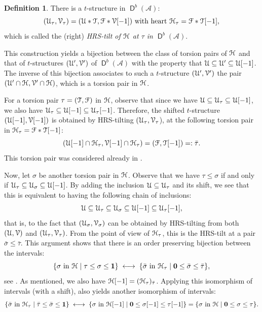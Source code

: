 \documentclass[a4paper,11pt]{amsart}
\theoremstyle{plain}
\theoremstyle{definition}
\newtheorem{dfn}[thm]{Definition}
\newcommand{\Acal}{\mathcal{A}} \newcommand{\Bcal}{\mathcal{B}} \newcommand{\Ccal}{\mathcal{C}}
\newcommand{\Vcal}{\mathcal{V}} \newcommand{\Wcal}{\mathcal{W}} \newcommand{\Xcal}{\mathcal{X}}
\DeclareMathOperator{\D}{\mathsf{D}}
\begin{document}
\begin{dfn}
	There is a $t$-structure in $\D^b(\Acal)$:
	\[(\Ucal_\tau,\Vcal_\tau)=(\Ucal\ast\Tcal,\Fcal\ast\Vcal[-1])\text{ with heart }
	\Hcal_\tau=\Fcal\ast\Tcal[-1],\]
	which is called the (right) \emph{HRS-tilt of
	$\mathcal{H}$ at $\tau$ in $\D^b(\Acal)$}.
\end{dfn}

This construction yields a bijection between the class of torsion pairs of
$\mathcal{H}$ and that of $t$-structures $(\Ucal',\Vcal')$ of $\D^b(\Acal)$ with the
property that $\mathcal{U}\subseteq \mathcal{U}'\subseteq\mathcal{U}[-1]$. The
inverse of this bijection associates to such a $t$-structure $(\Ucal',\Vcal')$ the
pair $(\Ucal'\cap\Hcal,\Vcal'\cap\Hcal)$, which is a torsion pair in $\mathcal{H}$.

For a torsion pair $\tau=(\mathcal{T},\mathcal{F})$ in $\mathcal{H}$, observe that since we have
$\mathcal{U}\subseteq\mathcal{U}_\tau\subseteq\mathcal{U}[-1]$, we also have
$\mathcal{U}_\tau\subseteq\mathcal{U}[-1]\subseteq\mathcal{U}_\tau[-1]$. Therefore, the shifted
$t$-structure $(\Ucal[-1],\Vcal[-1])$ is obtained by HRS-tilting
$(\Ucal_\tau,\Vcal_\tau$), at the following torsion pair in
$\mathcal{H}_\tau=\mathcal{F}\ast\mathcal{T}[-1]$:
\[(\Ucal[-1]\cap\Hcal_\tau,\Vcal[-1]\cap\Hcal_\tau)=(\Fcal,\Tcal[-1])=:\bar\tau.\]
This torsion pair was considered already in \cite{happ-reit-smal-96}.

Now, let $\sigma$ be another torsion pair in $\mathcal{H}$. Observe that we have
$\tau\leq\sigma$ if and only if
$\mathcal{U}_\tau\subseteq\mathcal{U}_\sigma\subseteq\mathcal{U}[-1]$. By adding the inclusion
$\mathcal{U}\subseteq\mathcal{U}_\tau$ and its shift, we see that this is equivalent to
having the following chain of inclusions:
\[\mathcal{U}\subseteq\mathcal{U}_\tau\subseteq\mathcal{U}_\sigma\subseteq\mathcal{U}[-1]\subseteq\mathcal{U}_\tau[-1],\]
that is, to the fact that $(\Ucal_\sigma,\Vcal_\sigma)$ can be obtained by
HRS-tilting from both $(\Ucal,\Vcal)$ and $(\Ucal_\tau,\Vcal_\tau)$. From the
point of view of $\mathcal{H}_\tau$, this is the HRS-tilt at a pair $\bar\sigma\leq
\bar\tau$. This argument shows that there is an order preserving bijection
between the intervals:
\[\{\sigma\text{ in }\mathcal{H}\mid \tau\leq \sigma\leq \mathbf{1}\}
\;\longleftrightarrow\;
\{\bar\sigma\text{ in }\mathcal{H}_\tau\mid \mathbf{0}\leq\bar\sigma\leq \bar\tau \},
\]
see \cite[Prop.~7.5]{ange-laki-stov-vito-22}.
As mentioned, we also have $\mathcal{H}[-1]=(\mathcal{H}_\tau)_{\bar\tau}$. Applying this
isomorphism of intervals (with a shift), also yields another isomorphism of
intervals:
\[
\{\bar\sigma\text{ in }\mathcal{H}_\tau\mid \bar\tau\leq
\bar\sigma\leq\mathbf{1}\}\;\longleftrightarrow\;
\{\sigma\text{ in }\mathcal{H}[-1]\mid \mathbf{0}\leq\sigma[-1]\leq \tau[-1]\}=
\{\sigma\text{ in }\mathcal{H}\mid \mathbf{0}\leq\sigma\leq \tau\}.
\]
\end{document}
